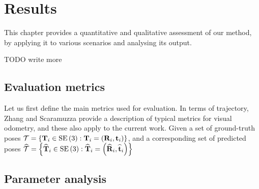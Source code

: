 \chapter{Results}
\label{ch:results}

This chapter provides a quantitative and qualitative assessment of our method, by applying it to various scenarios and analysing its output.

TODO write more

\section{Evaluation metrics}
Let us first define the main metrics used for evaluation. In terms of trajectory, Zhang and Scaramuzza \cite{zhang2018tutorial} provide a description of typical metrics for visual odometry, and these also apply to the current work. Given a set of ground-truth poses
\mbox{$\mathcal{T} = \left\{ \mathbf{T}_i \in \operatorname{SE}\left(3\right) : \mathbf{T}_i = \left( \mathbf{R}_i, \mathbf{t}_i\right)\right\}$}, and a corresponding set of predicted poses
\mbox{$
        \widehat{\mathcal{T}} = \left\{ \widehat{\mathbf{T}}_i \in \operatorname{SE}\left(3\right) : \widehat{\mathbf{T}}_i = \left( \widehat{\mathbf{R}}_i, \widehat{\mathbf{t}}_i\right)\right\}
    $}


\section{Parameter analysis}

